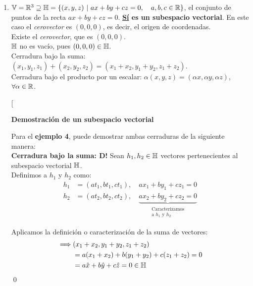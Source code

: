 \begin{enumerate}
    \item $\mathbb{V} = \mathbb{R}^3 \supseteq \mathbb{H} = \left\{ (x,y,z) \ \middle| \ ax + by + cz = 0, \quad a,b,c \in \mathbb{R} \right\}$, el conjunto de puntos de la recta $ax + by + cz = 0$. \textbf{\underline{Sí} es un subespacio vectorial}. En este caso el \textit{cerovector} es $(0, 0, 0)$, es decir, el origen de coordenadas.\\
        \checkmark Existe el \textit{cerovector}, que es $(0, 0, 0)$. \\
        \checkmark $\mathbb{H}$ no es vacío, pues $(0, 0, 0) \in \mathbb{H}$. \\
        \checkmark Cerradura bajo la suma: $(x_1, y_1, z_1) + (x_2, y_2, z_2) = (x_1 + x_2, y_1 + y_2, z_1 + z_2)$. \\
        \checkmark Cerradura bajo el producto por un escalar: $\alpha (x, y, z) = (\alpha x, \alpha y, \alpha z)$, $\forall \alpha \in \mathbb{R}$.

    \begin{note}
    [
        \begin{center}
            \textbf{Demostración de un subespacio vectorial}
        \end{center}

        \vspace*{1em}

        Para el \textbf{ejemplo 4}, puede demostrar ambas cerraduras de la siguiente manera: \\

        \textbf{Cerradura bajo la suma: D!} Sean $h_1, h_2 \in \mathbb{H}$ vectores pertenecientes al subespacio vectorial $\mathbb{H}$. \\ Definimos a $h_1$ y $h_2$ como:
        \begin{align*}
            h_1 &= (at_1, bt_1, ct_1), \quad ax_1 + by_1 + cz_1 = 0 \\
            h_2 &= (at_2, bt_2, ct_2), \quad \underbrace{ax_2 + by_2 + cz_2 = 0}_{\substack{\text{Caracterizamos}\\\text{a }h_1 \text{ y }h_2}}
        \end{align*}

        Aplicamos la definición o caracterización de la suma de vectores:
        \begin{align*}
            \implies &(x_1 + x_2, y_1 + y_2, z_1 + z_2) \\
            &= a(x_1 + x_2) + b(y_1 + y_2) + c(z_1 + z_2) = 0 \\
            &= a\hat{x} + b\hat{y} + c\hat{z} = 0 \in \mathbb{H}
        \end{align*}\qed


\end{note}
\end{enumerate}
